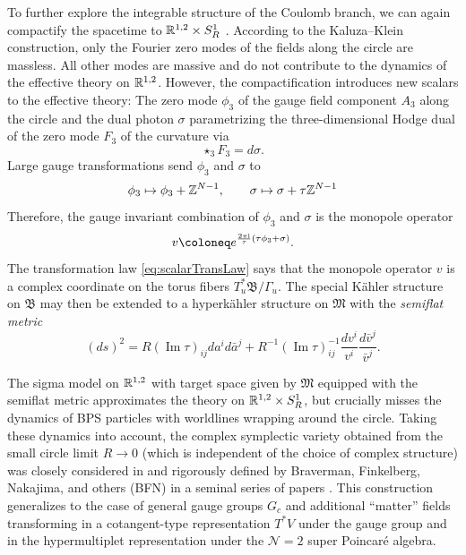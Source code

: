 To further explore the integrable structure of the Coulomb branch, we can again compactify the spacetime to $\mathbb{R}^{1,2} \times S_R^1$ \cite{seiberg_gauge_1996,gaiotto_four-dimensional_2010,gaiotto_wall-crossing_2011,gaiotto_three_2013}. According to the Kaluza--Klein construction, only the Fourier zero modes of the fields along the circle are massless. All other modes are massive and do not contribute to the dynamics of the effective theory on $\mathbb{R}^{1,2}$. However, the compactification introduces new scalars to the effective theory: The zero mode $\phi_3$ of the gauge field component $A_3$ along the circle and the dual photon $\sigma$ parametrizing the three-dimensional Hodge dual of the zero mode $F_3$ of the curvature via
\begin{equation}
	\star_3 F_3 = d\sigma.
\end{equation}
Large gauge transformations send $\phi_3$ and $\sigma$ to
\begin{equation}\label{eq:scalarTransLaw}
	\phi_3 \mapsto \phi_3 + \mathbb{Z}^{N-1}, \qquad \sigma \mapsto \sigma + \tau \mathbb{Z}^{N-1}
\end{equation}
Therefore, the gauge invariant combination of $\phi_3$ and $\sigma$ is the monopole operator
\begin{equation}\label{eq:monoOp}
	v \coloneq e^{\frac{2\pi\I}{\tau} (\tau \phi_3 + \sigma)}.
\end{equation}
The transformation law \eqref{eq:scalarTransLaw} says that the monopole operator $v$ is a complex coordinate on the torus fibers $T_u^* \mathfrak{B}/\Gamma_u$. The special Kähler structure on $\mathfrak{B}$ may then be extended to a hyperkähler structure on $\mathfrak{M}$ with the \emph{semiflat metric}
\begin{equation}
	(ds)^2 = R (\operatorname{Im} \tau)_{ij} da^i d\bar a^j + R^{-1} (\operatorname{Im} \tau)^{-1}_{ij} \frac{dv^i}{v^i} \frac{d\bar v^j}{\bar v^j}.
\end{equation}

The sigma model on $\mathbb{R}^{1,2}$ with target space given by $\mathfrak{M}$ equipped with the semiflat metric approximates the theory on $\mathbb{R}^{1,2} \times S_R^1$, but crucially misses the dynamics of BPS particles with worldlines wrapping around the circle. Taking these dynamics into account, the complex symplectic variety obtained from the small circle limit $R \to 0$ (which is independent of the choice of complex structure) was closely considered in \cite{bullimore_coulomb_2015} and rigorously defined by Braverman, Finkelberg, Nakajima, and others (BFN) in a seminal series of papers \cite{nakajima_towards_2016,braverman_towards_2018,braverman_coulomb_2018}. This construction generalizes to the case of general gauge groups $G_c$ and additional ``matter'' fields transforming in a cotangent-type representation $T^* V$ under the gauge group and in the hypermultiplet representation under the $\mathcal{N}=2$ super Poincaré algebra.

